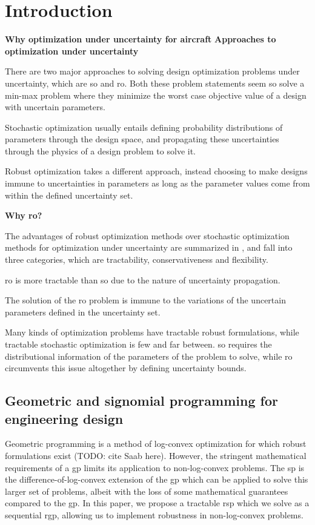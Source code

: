 \section{Introduction}

\textbf{Why optimization under uncertainty for aircraft}
\newline
\textbf{Approaches to optimization under uncertainty}

There are two major approaches to solving design optimization problems under uncertainty,
which are \gls{so} and \gls{ro}. Both these problem statements seem so solve a min-max problem
where they minimize the worst case objective value of a design with uncertain parameters.

Stochastic optimization usually entails defining probability distributions of
parameters through the design space, and propagating these uncertainties through the
physics of a design problem to solve it.

Robust optimization takes a different approach, instead choosing to make designs immune to
uncertainties in parameters as long as the parameter values come from within the defined
uncertainty set.

\textbf{Why \gls{ro}?}

The advantages of robust optimization methods over stochastic optimization methods
for optimization under uncertainty are summarized in \cite{Bertsimas2011}, 
and fall into three categories, which are tractability, conservativeness and flexibility.

\gls{ro} is more tractable than \gls{so} due to the nature of uncertainty propagation.


The solution of the \gls{ro} problem is immune to the variations of the uncertain
parameters defined in the uncertainty set.

Many kinds of optimization problems have tractable robust formulations, while tractable stochastic
optimization is few and far between. \gls{so} requires the
distributional information of the parameters of the problem to solve, while \gls{ro} circumvents
this issue altogether by defining uncertainty bounds.

\subsection{Geometric and signomial programming for engineering design}

Geometric programming is a method of log-convex optimization for which robust formulations exist
(TODO: cite Saab here).
However, the stringent mathematical requirements of a \gls{gp} limits its application to non-log-convex problems.
The \gls{sp} is the difference-of-log-convex extension of the \gls{gp} which can be applied to
solve this larger set of problems, albeit with the loss of some mathematical guarantees compared to the \gls{gp}.
In this paper, we propose a tractable \gls{rsp} which we solve as a sequential \gls{rgp},
allowing us to implement robustness in non-log-convex problems.

